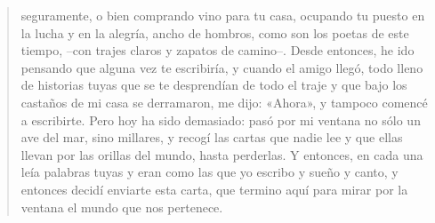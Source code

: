 \documentclass[12pt]{article}
\begin{document}
\begin{verse}
seguramente, o bien comprando vino para tu casa,  
ocupando tu puesto en la lucha y en la alegría,  
ancho de hombros, como son los poetas de este tiempo,  
--con trajes claros y zapatos de camino--.  
Desde entonces, he ido pensando que alguna vez te escribiría,  
y cuando el amigo llegó, todo lleno de historias tuyas  
que se te desprendían de todo el traje  
y que bajo los castaños de mi casa se derramaron,  
me dijo: «Ahora», y tampoco comencé a escribirte.  
Pero hoy ha sido demasiado: pasó por mi ventana  
no sólo un ave del mar, sino millares,  
y recogí las cartas que nadie lee y que ellas llevan  
por las orillas del mundo, hasta perderlas.  
Y entonces, en cada una leía palabras tuyas  
y eran como las que yo escribo y sueño y canto,  
y entonces decidí enviarte esta carta, que termino aquí  
para mirar por la ventana el mundo que nos pertenece.  
\end{verse}
\end{document}
